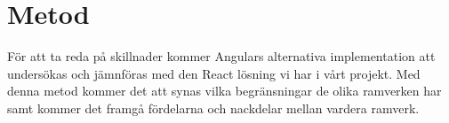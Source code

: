 \section{Metod}
\label{sec:axel-method}

För att ta reda på skillnader kommer Angulars alternativa implementation att undersökas och jämnföras med den React lösning vi har i vårt projekt. Med denna metod kommer det att synas vilka begränsningar de olika ramverken har samt kommer det framgå fördelarna och nackdelar mellan vardera ramverk. 